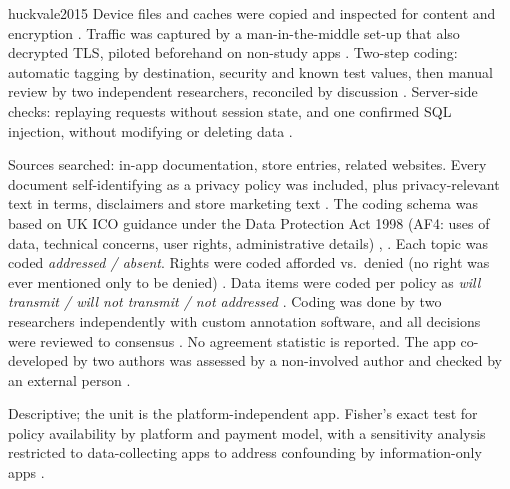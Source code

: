 \begin{papercard}{huckvale2015}
 Device files and caches were copied and inspected for content and encryption . Traffic was captured by a man-in-the-middle set-up that also decrypted TLS, piloted beforehand on non-study apps . Two-step coding: automatic tagging by destination, security and known test values, then manual review by two independent researchers, reconciled by discussion . Server-side checks: replaying requests without session state, and one confirmed SQL injection, without modifying or deleting data .

 Sources searched: in-app documentation, store entries, related websites. Every document self-identifying as a privacy policy was included, plus privacy-relevant text in terms, disclaimers and store marketing text . The coding schema was based on UK ICO guidance under the Data Protection Act 1998 (AF4: uses of data, technical concerns, user rights, administrative details) , . Each topic was coded \emph{addressed / absent}. Rights were coded afforded vs.\ denied (no right was ever mentioned only to be denied) . Data items were coded per policy as \emph{will transmit / will not transmit / not addressed} . Coding was done by two researchers independently with custom annotation software, and all decisions were reviewed to consensus . No agreement statistic is reported. The app co-developed by two authors was assessed by a non-involved author and checked by an external person .

 Descriptive; the unit is the platform-independent app. Fisher's exact test for policy availability by platform and payment model, with a sensitivity analysis restricted to data-collecting apps to address confounding by information-only apps .


\end{papercard}
